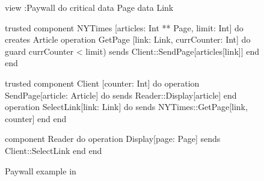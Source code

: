 \begin{figure}[ht]
\centering
  \begin{slang}
view :Paywall do
  critical data Page
  data Link
  
  trusted component NYTimes [articles: Int ** Page, limit: Int] do
    creates Article
    operation GetPage [link: Link, currCounter: Int] do
      guard { currCounter < limit) }
      sends { Client::SendPage[articles[link]] }
    end
  end

  trusted component Client [counter: Int] do
    operation SendPage[article: Article] do 
      sends { Reader::Display[article] }
    end
    operation SelectLink[link: Link] do
      sends { NYTimes::GetPage[link, counter] }
    end
  end

  component Reader do
    operation Display[page: Page]
    sends { Client::SelectLink }
  end
end
  \end{slang}

\caption{Paywall example in \sLang}
\label{fig-paywall-slang}
\end{figure}
